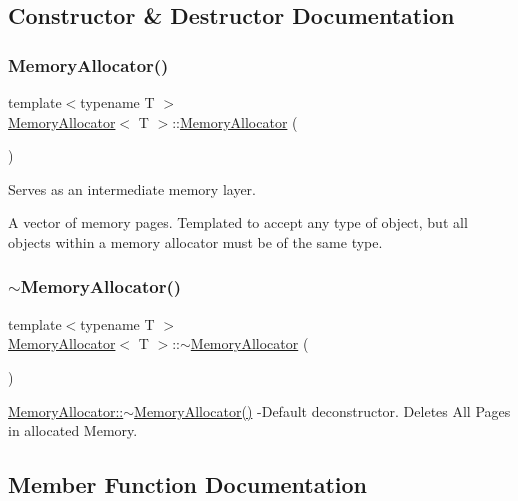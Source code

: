 \subsection{Constructor \& Destructor Documentation}
\mbox{\label{class_memory_allocator_a9c7ca60e8881012d0311c98689359c91}} 
\subsubsection{\texorpdfstring{Memory\+Allocator()}{MemoryAllocator()}}
{\footnotesize\ttfamily template$<$typename T $>$ \\
\hyperlink{class_memory_allocator}{Memory\+Allocator}$<$ T $>$\+::\hyperlink{class_memory_allocator}{Memory\+Allocator} (\begin{DoxyParamCaption}{ }\end{DoxyParamCaption})}

Serves as an intermediate memory layer.

A vector of memory pages. Templated to accept any type of object, but all objects within a memory allocator must be of the same type. \mbox{\label{class_memory_allocator_a06ba8aa77baa4fea0096da7f0c720e7b}} 
\subsubsection{\texorpdfstring{$\sim$\+Memory\+Allocator()}{~MemoryAllocator()}}
{\footnotesize\ttfamily template$<$typename T $>$ \\
\hyperlink{class_memory_allocator}{Memory\+Allocator}$<$ T $>$\+::$\sim$\hyperlink{class_memory_allocator}{Memory\+Allocator} (\begin{DoxyParamCaption}{ }\end{DoxyParamCaption})}

\hyperlink{class_memory_allocator_a06ba8aa77baa4fea0096da7f0c720e7b}{Memory\+Allocator\+::$\sim$\+Memory\+Allocator()} -\/\+Default deconstructor. Deletes All Pages in allocated Memory. 

\subsection{Member Function Documentation}
\mbox{\label{class_memory_allocator_a0afd80ad46c6631bc7986d8a3fe36f3c}} 
